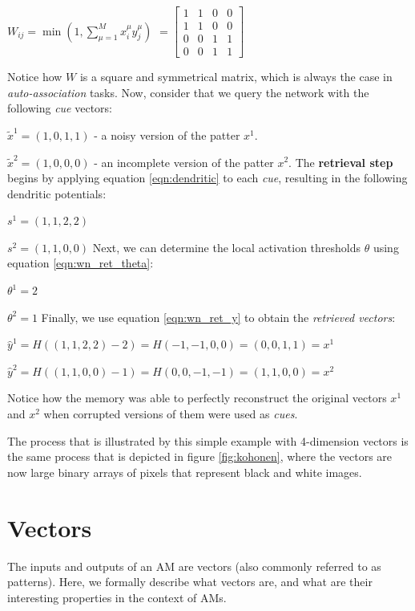 \documentclass[runningheads]{llncs}
\begin{document}
$W_{i j}=\min \left(1, \sum_{\mu=1}^{M} x_{i}^{\mu} y_{j}^{\mu}\right)$
$=\left[\begin{array}{llll}
1 & 1 & 0 & 0 \\
1 & 1 & 0 & 0 \\
0 & 0 & 1 & 1 \\
0 & 0 & 1 & 1 
\end{array}\right]$
\newline

Notice how $W$ is a square and symmetrical matrix, which is always the case in \textit{auto-association} tasks.
\newline
\newline
Now, consider that we query the network with the following \textit{cue} vectors:

$\tilde{x}^{1} = (1,0,1,1)$ - a noisy version of the patter $x^{1}$. 

$\tilde{x}^{2} = (1,0,0,0)$ - an incomplete version of  the patter $x^{2}$.
\newline
\newline
The \textbf{retrieval step} begins by applying equation \ref{eqn:dendritic} to each \textit{cue}, resulting in the following dendritic potentials:

$s^1=(1,1,2,2)$

$s^2=(1,1,0,0)$
\newline
Next, we can determine the local activation thresholds $\theta$ using equation \ref{eqn:wn_ret_theta}:

$\theta^1=2$

$\theta^2=1$
\newline
Finally, we use equation \ref{eqn:wn_ret_y} to obtain the \textit{retrieved vectors}:

$\hat{y}^1 = H((1,1,2,2) - 2) = H(-1,-1,0,0) = (0,0,1,1) = x^1$

$\hat{y}^2 = H((1,1,0,0) - 1) = H(0,0,-1,-1) = (1,1,0,0) = x^2$
\newline

Notice how the memory was able to perfectly reconstruct the original vectors $x^1$ and $x^2$ when corrupted versions of them were used as \textit{cues}. 

The process that is illustrated by this simple example with 4-dimension vectors is the same process that is depicted in figure \ref{fig:kohonen}, where the vectors are now large binary arrays of pixels that represent black and white images.
\newpage

\section{Vectors}
\label{sec:inputoutput}
The inputs and outputs of an AM are vectors (also commonly referred to as patterns). Here, we formally describe what vectors are, and what are their interesting properties in the context of AMs.
\end{document}
